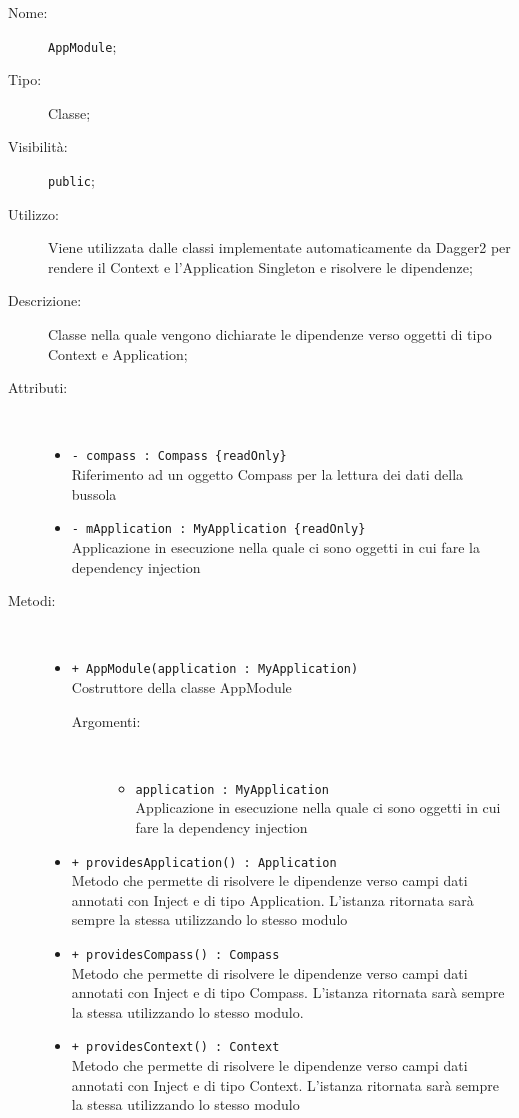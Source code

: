 \documentclass[../DefinizioneDiProdotto.tex]{subfiles}
\begin{document}
\begin{description}
	\item[Nome:] \texttt{AppModule};
	\item[Tipo:] Classe;
	\item[Visibilità:] \texttt{public};
	\item[Utilizzo:] Viene utilizzata dalle classi implementate automaticamente da Dagger2 per rendere il Context e l'Application Singleton e risolvere le dipendenze;
	\item[Descrizione:] Classe nella quale vengono dichiarate le dipendenze verso oggetti di tipo Context e Application;
	\item[Attributi:] \
	\begin{itemize}
		\item \texttt{- compass : Compass \{readOnly\}}\\
		Riferimento ad un oggetto Compass per la lettura dei dati della bussola
		
		\item \texttt{- mApplication : MyApplication \{readOnly\}}\\
		Applicazione in esecuzione nella quale ci sono oggetti in cui fare la dependency injection
		
	\end{itemize}
	\item[Metodi:] \
	\begin{itemize}
		\item \texttt{+ AppModule(application : MyApplication)}\\
		Costruttore della classe AppModule
		\begin{description}
			\item[Argomenti:] \
			\begin{itemize}
				\item \texttt{application : MyApplication}\\
				Applicazione in esecuzione nella quale ci sono oggetti in cui fare la dependency injection\end{itemize}
		\end{description}
		\item \texttt{+ providesApplication() : Application}\\
		Metodo che permette di risolvere le dipendenze verso campi dati annotati con Inject e di tipo Application. L'istanza ritornata sarà sempre la stessa utilizzando lo stesso modulo
		\item \texttt{+ providesCompass() : Compass}\\
		Metodo che permette di risolvere le dipendenze verso campi dati annotati con Inject e di tipo Compass. L'istanza ritornata sarà sempre la stessa utilizzando lo stesso modulo.
		\item \texttt{+ providesContext() : Context}\\
		Metodo che permette di risolvere le dipendenze verso campi dati annotati con Inject e di tipo Context. L'istanza ritornata sarà sempre la stessa utilizzando lo stesso modulo
	\end{itemize}
\end{description}
\end{document}
